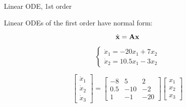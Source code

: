 \documentclass{beamer}
\begin{document}
\begin{frame}{Linear ODE, 1st order}
\begin{flushleft}

Linear ODEs of the first order have normal form:

\begin{equation}
    \dot{\mathbf{x}} = \mathbf{A} \mathbf{x}
\end{equation}

\begin{example}
\begin{equation}
\begin{cases}
    \dot{x}_1 = -20 x_1 + 7 x_2 \\
    \dot{x}_2 = 10.5 x_1 - 3 x_2
\end{cases}
\end{equation}
\end{example}

\begin{example}
\begin{equation}
\begin{bmatrix}
\dot{x}_1 \\
\dot{x}_2 \\
\dot{x}_3
\end{bmatrix} 
= 
\begin{bmatrix}
-8   & 5   & 2  \\
 0.5 & -10 & -2 \\
 1   & -1 & -20
\end{bmatrix}
\begin{bmatrix}
x_1 \\
x_2 \\
x_3
\end{bmatrix} 
\end{equation}
\end{example}

\end{flushleft}
\end{frame}
\end{document}
